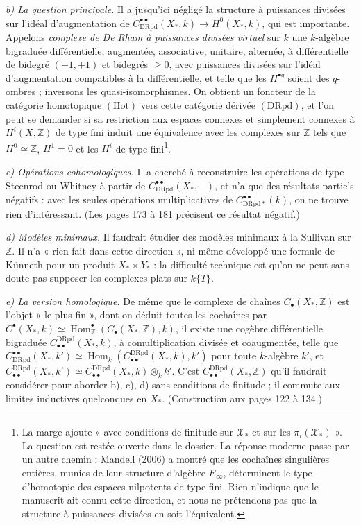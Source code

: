 \documentclass[11pt,a4paper]{article}
\begin{document}
\emph{b) La question principale.} Il a jusqu'ici négligé la structure à
puissances divisées sur l'idéal d'augmentation de
$C^{\bullet\bullet}_{\mathrm{DRpd}}(X_*, k) \to H^0(X_*, k)$, qui est
importante. Appelons \emph{complexe de De Rham à puissances divisées virtuel}
sur $k$ une $k$-algèbre bigraduée différentielle, augmentée, associative,
unitaire, alternée, à différentielle de bidegré $(-1,+1)$ et bidegrés
$\geq 0$, avec puissances divisées sur l'idéal d'augmentation compatibles à la
différentielle, et telle que les $H^{\bullet q}$ soient des $q$-ombres ;
inversons les quasi-isomorphismes. On obtient un foncteur de la catégorie
homotopique $(\mathrm{Hot})$ vers cette catégorie dérivée $(\mathrm{DRpd})$, et
l'on peut se demander si sa restriction aux espaces connexes et simplement
connexes à $H^i(X, \mathbb{Z})$ de type fini induit une équivalence avec les
complexes sur $\mathbb{Z}$ tels que $H^0 \simeq \mathbb{Z}$, $H^1 = 0$ et les
$H^i$ de type fini\footnote{La marge ajoute « avec conditions de finitude sur
$\mathcal{X}_*$ et sur les $\pi_i(\mathcal{X}_*)$ ». La question est restée
ouverte dans le dossier. La réponse moderne passe par un autre chemin : Mandell
(2006) a montré que les cochaînes singulières entières, munies de leur
structure d'algèbre $E_\infty$, déterminent le type d'homotopie des espaces
nilpotents de type fini. Rien n'indique que le manuscrit ait connu cette
direction, et nous ne prétendons pas que la structure à puissances divisées en
soit l'équivalent.}.

\emph{c) Opérations cohomologiques.} Il a cherché à reconstruire les
opérations de type Steenrod ou Whitney à partir de
$C^{\bullet\bullet}_{\mathrm{DRpd}}(X_*, -)$, et n'a que des résultats partiels
négatifs : avec les seules opérations multiplicatives de
$C^{\bullet\bullet}_{\mathrm{DRpd}*}(k)$, on ne trouve rien d'intéressant. (Les
pages 173 à 181 précisent ce résultat négatif.)

\emph{d) Modèles minimaux.} Il faudrait étudier des modèles minimaux à la
Sullivan sur $\mathbb{Z}$. Il n'a « rien fait dans cette direction », ni même
développé une formule de Künneth pour un produit $X_* \times Y_*$ : la
difficulté technique est qu'on ne peut sans doute pas supposer les complexes
plats sur $k\{T\}$.

\emph{e) La version homologique.} De même que le complexe de chaînes
$C_\bullet(X_*, \mathbb{Z})$ est l'objet « le plus fin », dont on déduit toutes
les cochaînes par $C^\bullet(X_*, k) \simeq \operatorname{Hom}^\bullet_{\mathbb{Z}}
(C_\bullet(X_*, \mathbb{Z}), k)$, il existe une cogèbre différentielle
bigraduée $C^{\mathrm{DRpd}}_{\bullet\bullet}(X_*, k)$, à comultiplication
divisée et coaugmentée, telle que $C^{\bullet\bullet}_{\mathrm{DRpd}}(X_*, k')
\simeq \operatorname{Hom}_k(C^{\mathrm{DRpd}}_{\bullet\bullet}(X_*, k), k')$
pour toute $k$-algèbre $k'$, et
$C^{\mathrm{DRpd}}_{\bullet\bullet}(X_*, k') \simeq
C^{\mathrm{DRpd}}_{\bullet\bullet}(X_*, k) \otimes_k k'$. C'est
$C^{\mathrm{DRpd}}_{\bullet\bullet}(X_*, \mathbb{Z})$ qu'il faudrait considérer
pour aborder b), c), d) sans conditions de finitude ; il commute aux limites
inductives quelconques en $X_*$. (Construction aux pages 122 à 134.)
\end{document}

